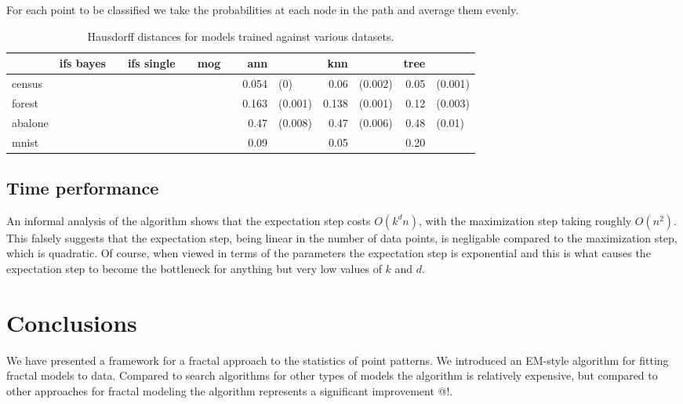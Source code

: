\documentclass[10pt,a4paper,oneside]{article}
\theoremstyle{definition}
\begin{document}
For each point to be classified we take the probabilities at each node in the path and average them evenly. 

\begin{table}[h]
\begin{tabular}{| l | r l r l | r l r l  r l r l |}
\hline
  & ifs bayes & & ifs single & & mog & & ann & & knn & & tree & \\
\hline
census  & & & & & & & 0.054 &\color{gray}(0) & 0.06 & \color{gray} (0.002) & 0.05 & \color{gray} (0.001) \\
forest  & & & & & & & 0.163 &\color{gray}(0.001) & 0.138 &\color{gray}(0.001) & 0.12&\color{gray}(0.003) \\
abalone & & & & & & & 0.47 & \color{gray}(0.008) & 0.47 & \color{gray}(0.006) & 0.48 & \color{gray}(0.01) \\
mnist   & & & & & & & 0.09 & & 0.05 & & 0.20 & \\
\hline

\end{tabular}
\caption{Hausdorff distances for models trained against various datasets.}
\label{classification-results}
\end{table}
\subsection{Time performance}

An informal analysis of the algorithm shows that the expectation step costs $O(k^dn)$, with the maximization step taking roughly $O(n^2)$. This falsely suggests that the expectation step, being linear in the number of data points, is negligable compared to the maximization step, which is quadratic. Of course, when viewed in terms of the parameters the expectation step is exponential and this is what causes the expectation step to become the bottleneck for anything but very low values of $k$ and $d$. 

\section*{Conclusions}

We have presented a framework for a fractal approach to the statistics of point patterns. We introduced an EM-style algorithm for fitting fractal models to data. Compared to search algorithms for other types of models the algorithm is relatively expensive, but compared to other approaches for fractal modeling the algorithm represents a significant improvement @!. 
\end{document}
